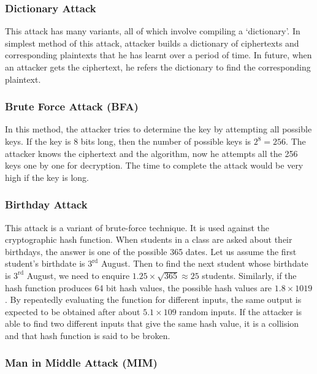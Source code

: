 \documentclass[british]{article}
\begin{document}
\subsubsection{Dictionary Attack}

This attack has many variants, all of which involve compiling a `dictionary'.
In simplest method of this attack, attacker builds a dictionary of
ciphertexts and corresponding plaintexts that he has learnt over a
period of time. In future, when an attacker gets the ciphertext, he
refers the dictionary to find the corresponding plaintext.

\subsubsection{Brute Force Attack (BFA)}

In this method, the attacker tries to determine the key by attempting
all possible keys. If the key is 8 bits long, then the number of possible
keys is $2^{8}=256$. The attacker knows the ciphertext and the algorithm,
now he attempts all the 256 keys one by one for decryption. The time
to complete the attack would be very high if the key is long.

\subsubsection{Birthday Attack}

This attack is a variant of brute-force technique. It is used against
the cryptographic hash function. When students in a class are asked
about their birthdays, the answer is one of the possible 365 dates.
Let us assume the first student's birthdate is $3^{\text{rd}}$ August.
Then to find the next student whose birthdate is $3^{\text{rd}}$
August, we need to enquire ${\displaystyle 1.25\times\sqrt{365}\approx25}$
students. Similarly, if the hash function produces 64 bit hash values,
the possible hash values are $1.8\times1019$. By repeatedly evaluating
the function for different inputs, the same output is expected to
be obtained after about $5.1\times109$ random inputs. If the attacker
is able to find two different inputs that give the same hash value,
it is a collision and that hash function is said to be broken.

\subsubsection{Man in Middle Attack (MIM)}
\end{document}
